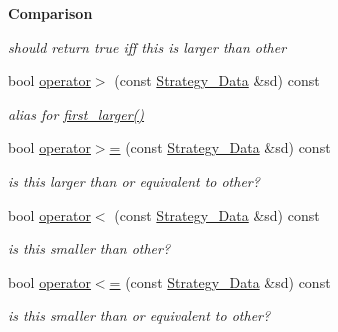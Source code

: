 \begin{Indent}{\bf Comparison}
\begin{DoxyCompactItemize}
\begin{DoxyCompactList}\small\item\em should return {\ttfamily true} iff {\ttfamily this} is larger than other \end{DoxyCompactList}\item 
\hypertarget{class_strategy___data_aa4197671f729755b3fbe32f615221fd5}{}bool \hyperlink{class_strategy___data_aa4197671f729755b3fbe32f615221fd5}{operator$>$} (const \hyperlink{class_strategy___data}{Strategy\+\_\+\+Data} \&sd) const \label{class_strategy___data_aa4197671f729755b3fbe32f615221fd5}

\begin{DoxyCompactList}\small\item\em alias for \hyperlink{class_strategy___data_ad47f2b1b43b8730885577dadd98af591}{first\+\_\+larger()} \end{DoxyCompactList}\item 
\hypertarget{class_strategy___data_ae7ec91ae3771d0a8d05556a946364daa}{}bool \hyperlink{class_strategy___data_ae7ec91ae3771d0a8d05556a946364daa}{operator$>$=} (const \hyperlink{class_strategy___data}{Strategy\+\_\+\+Data} \&sd) const \label{class_strategy___data_ae7ec91ae3771d0a8d05556a946364daa}

\begin{DoxyCompactList}\small\item\em is {\ttfamily this} larger than or equivalent to other? \end{DoxyCompactList}\item 
\hypertarget{class_strategy___data_a91d506d112c2a7ffc7884352c235a09b}{}bool \hyperlink{class_strategy___data_a91d506d112c2a7ffc7884352c235a09b}{operator$<$} (const \hyperlink{class_strategy___data}{Strategy\+\_\+\+Data} \&sd) const \label{class_strategy___data_a91d506d112c2a7ffc7884352c235a09b}

\begin{DoxyCompactList}\small\item\em is {\ttfamily this} smaller than other? \end{DoxyCompactList}\item 
\hypertarget{class_strategy___data_a3b8e78c7e9bfcf5a3dd25a9460926cf0}{}bool \hyperlink{class_strategy___data_a3b8e78c7e9bfcf5a3dd25a9460926cf0}{operator$<$=} (const \hyperlink{class_strategy___data}{Strategy\+\_\+\+Data} \&sd) const \label{class_strategy___data_a3b8e78c7e9bfcf5a3dd25a9460926cf0}

\begin{DoxyCompactList}\small\item\em is {\ttfamily this} smaller than or equivalent to other? \end{DoxyCompactList}\end{DoxyCompactItemize}
\end{Indent}


